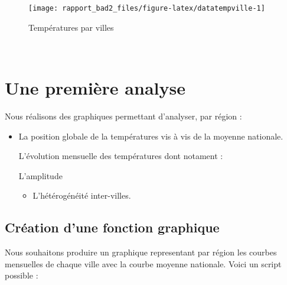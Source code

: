 \documentclass[
]{article}
\providecommand{\tightlist}{%
  \setlength{\itemsep}{0pt}\setlength{\parskip}{0pt}}
\begin{document}
\begin{figure}[h]

{\centering \texttt{[image: rapport\_bad2\_files/figure-latex/datatempville-1]} 

}

\caption{Températures par villes\label{fig:tempvilles}}\label{fig:datatempville}
\end{figure}

~

\hypertarget{une-premiuxe8re-analyse}{%
\section{\texorpdfstring{\textbf{Une première analyse
}}{Une première analyse }}\label{une-premiuxe8re-analyse}}

Nous réalisons des graphiques permettant d'analyser, par région :

\begin{itemize}
\item
  La position globale de la températures vis à vis de la moyenne
  nationale.

  L'évolution mensuelle des températures dont notament :

  L'amplitude

  \begin{itemize}
  \tightlist
  \item
    L'hétérogénéité inter-villes.
  \end{itemize}
\end{itemize}

\hypertarget{cruxe9ation-dune-fonction-graphique}{%
\subsection{\texorpdfstring{\textbf{Création d'une fonction
graphique}}{Création d'une fonction graphique}}\label{cruxe9ation-dune-fonction-graphique}}

Nous souhaitons produire un graphique representant par région les
courbes mensuelles de chaque ville avec la courbe moyenne nationale.
Voici un script possible :
\end{document}
